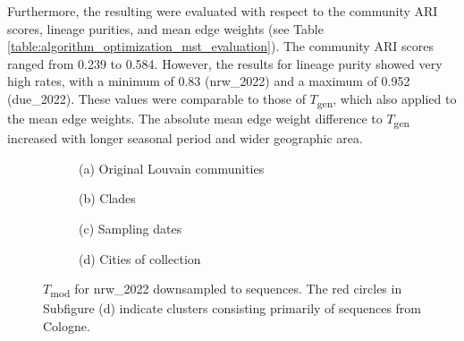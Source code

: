 Furthermore, the resulting  were evaluated with respect to the community ARI scores, lineage purities, and mean edge weights (see Table \ref{table:algorithm_optimization_mst_evaluation}). The community ARI scores ranged from 0.239 to 0.584. However, the results for lineage purity showed very high rates, with a minimum of 0.83 (nrw\_2022) and a maximum of 0.952 (due\_2022). These values were comparable to those of $T$\textsubscript{gen}, which also applied to the mean edge weights. The absolute mean edge weight difference to $T$\textsubscript{gen} increased with longer seasonal period and wider geographic area.

\begin{figure}[H]
  \centering
  \begin{subfigure}[b]{0.49\textwidth}
    
    \caption*{(a) Original Louvain communities}
  \end{subfigure}
  \hfill
  \begin{subfigure}[b]{0.49\textwidth}
    
    \caption*{(b) Clades}
  \end{subfigure}
     \par\vspace{1em}
  \begin{subfigure}[b]{0.49\textwidth}
    
    \caption*{(c) Sampling dates}
  \end{subfigure}
  \begin{subfigure}[b]{0.49\textwidth}
    
    \caption*{(d) Cities of collection}
  \end{subfigure}
  \caption[$T$\textsubscript{mod} for nrw\_2022 downsampled to 1,250 sequences]{$T$\textsubscript{mod} for nrw\_2022 downsampled to sequences. The red circles in Subfigure (d) indicate clusters consisting primarily of sequences from Cologne.}
  \label{fig:gentrain_vs_optimization_mst_nrw_2022}
\end{figure}

